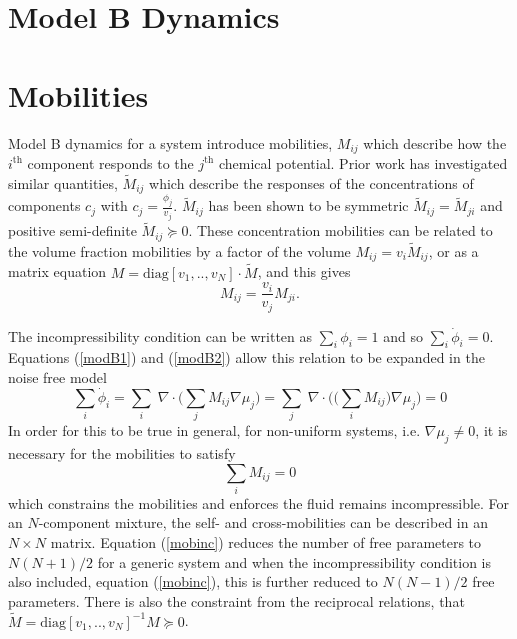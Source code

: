\section{Model B Dynamics}

\section{Mobilities}

Model B dynamics for a system introduce mobilities, $M_{ij}$ which describe how the $i^{\text{th}}$ component responds to the $j^{\text{th}}$ chemical potential. Prior work has investigated similar quantities, $\widetilde{M}_{ij}$ which describe the responses of the concentrations of components $c_j$ with $c_j = \frac{\phi_j}{v_j}$. $\widetilde{M}_{ij}$ has been shown to be symmetric $\widetilde{M}_{ij} = \widetilde{M}_{ji}$ and positive semi-definite $\widetilde{M}_{ij} \succcurlyeq 0$\cite{onsager_reciprocal_1931}. These concentration mobilities can be related to the volume fraction mobilities by a factor of the volume ${M}_{ij} = v_i\widetilde{M}_{ij}$, or as a matrix equation $M = \text{diag}[v_1, .., v_N]\cdot\widetilde{M}$, and this gives
\begin{equation}
    {M}_{ij} = \frac{v_i}{v_j}{M}_{ji}.
    \label{mobsym}
\end{equation}

The incompressibility condition can be written as $\sum_i\phi_i = 1$ and so $\sum_i\dot{\phi}_i = 0$. Equations (\ref{modB1}) and (\ref{modB2}) allow this relation to be expanded in the noise free model
\begin{equation}
    \sum_i\dot{\phi}_i = \sum_i\;\nabla\cdot\bigg(\sum_j M_{ij}\nabla\mu_j\bigg) = \sum_j\;\nabla\cdot\bigg(\big(\sum_i M_{ij}\big)\nabla\mu_j\bigg) = 0
\end{equation}
In order for this to be true in general, for non-uniform systems, i.e. $\nabla\mu_j \neq 0$, it is necessary for the mobilities to satisfy
\begin{equation}
    \sum_i M_{ij} = 0
    \label{mobinc}
\end{equation}
which constrains the mobilities and enforces the fluid remains incompressible. For an $N$-component mixture, the self- and cross-mobilities can be described in an $N\times N$ matrix. Equation (\ref{mobinc}) reduces the number of free parameters to $N(N+1)/2$ for a generic system and when the incompressibility condition is also included, equation (\ref{mobinc}), this is further reduced to $N(N-1)/2$ free parameters. There is also the constraint from the reciprocal relations, that $\widetilde{M} = \text{diag}[v_1, .., v_N]^{-1}M \succcurlyeq 0$.

